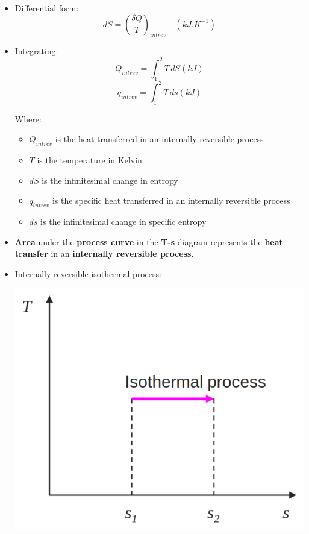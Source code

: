 \documentclass[11pt]{article}
\begin{document}
\begin{itemize}
\item Differential form:
\[dS = \left(\frac{\delta Q}{T} \right)_{int rev} \quad \left(\unit{kJ.K^{-1}}\right)\]

\item Integrating:
\[Q_{int rev} = \int_1^2 T \, dS \left(\unit{kJ} \right)\]
\[q_{int rev} = \int_1^2 T \, ds \left(\unit{kJ} \right)\]

Where:
\begin{itemize}
\item \(Q_{int rev}\) is the heat transferred in an internally reversible process
\item \(T\) is the temperature in Kelvin
\item \(dS\) is the infinitesimal change in entropy
\item \(q_{int rev}\) is the specific heat transferred in an internally reversible process
\item \(ds\) is the infinitesimal change in specific entropy
\end{itemize}
\item \textbf{Area} under the \textbf{process curve} in the \textbf{T-s} diagram represents the \textbf{heat transfer} in an \textbf{internally reversible process}.
\item Internally reversible isothermal process:
\begin{center}
\includegraphics[scale=0.65]{./images/isothermal-process.png}
\end{center}


\end{itemize}
\end{document}
